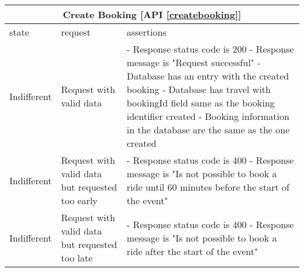 \begin{center}
	\begin{tabular}{|p{}|p{}|p{}|}
		\hline
		\multicolumn{3}{c}{Create Booking [API \ref{createbooking}]}\\
		
		\hline
		state & request & assertions \\
		
		\hline
		Indifferent &
		Request with valid data & 
		- Response status code is 200 \newline
		- Response message is "Request successful" \newline
		- Database has an entry with the created booking \newline
		- Database has travel with bookingId field same as the booking identifier created \newline
		- Booking information in the database are the same as the one created
		\\
		
		\hline
		Indifferent &
		Request with valid data but requested too early & 
		- Response status code is 400 \newline
		- Response message is "Is not possible to book a ride until 60 minutes before the start of the event"\newline
		\\
		
		\hline
		Indifferent &
		Request with valid data but requested too late & 
		- Response status code is 400 \newline
		- Response message is "Is not possible to book a ride after the start of the event" \newline
		\\
		
		\hline
	\end{tabular}
\end{center}

